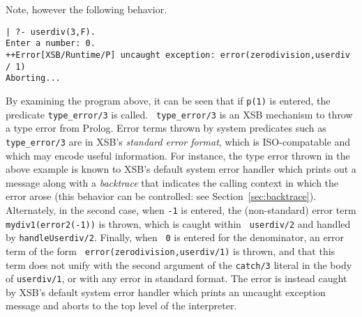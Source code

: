\noindent
Note, however the following behavior.

\begin{small}
\begin{verbatim}
| ?- userdiv(3,F).
Enter a number: 0.
++Error[XSB/Runtime/P] uncaught exception: error(zerodivision,userdiv / 1)
Aborting...
\end{verbatim}
\end{small}

\noindent
By examining the program above, it can be seen that if {\tt p(1)} is
entered, the predicate {\tt type\_error/3} is called.  {\tt
  type\_error/3} is an XSB mechanism to throw a type error from
Prolog.  Error terms thrown by system predicates such as {\tt
  type\_error/3} are in XSB's {\em standard error format}, which is
ISO-compatable and which may encode useful information.  For instance,
the type error thrown in the above example is known to XSB's default
system error handler which prints out a message along with a {\em
  backtrace} that indicates the calling context in which the error
arose (this behavior can be controlled: see
Section~\ref{sec:backtrace}).  Alternately, in the second case, when
{\tt -1} is entered, the (non-standard) error term {\tt
  mydiv1(error2(-1))} is thrown, which is caught within {\tt
  userdiv/2} and handled by {\tt handleUserdiv/2}.  Finally, when {\tt
  0} is entered for the denominator, an error term of the form {\tt
  error(zerodivision,userdiv/1)} is thrown, and that this term does
not unify with the second argument of the {\tt catch/3} literal in the
body of {\tt userdiv/1}, or with any error in standard format.  The
error is instead caught by XSB's default system error handler which
prints an uncaught exception message and aborts to the top level of
the interpreter.

